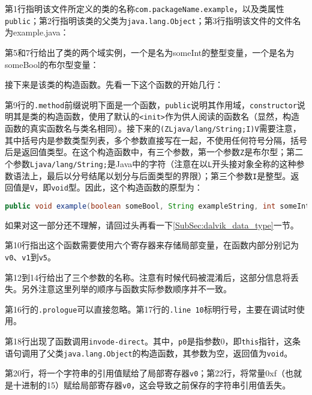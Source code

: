 第1行指明该文件所定义的类的名称\lstinline!com.packageName.example!，以及类属性\lstinline!public!；第2行指明该类的父类为\lstinline!java.lang.Object!；第3行指明该文件的文件名为example.java：


第5和7行给出了类的两个域实例，一个是名为someInt的整型变量，一个是名为someBool的布尔型变量：


接下来是该类的构造函数。先看一下这个函数的开始几行：

第9行的\lstinline!.method!前缀说明下面是一个函数，\lstinline!public!说明其作用域，\lstinline!constructor!说明其是类的构造函数，使用了默认的\lstinline!<init>!作为供人阅读的函数名（显然，构造函数的真实函数名与类名相同）。接下来的\lstinline!(ZLjava/lang/String;I)V!需要注意，其中括号内是参数类型列表，多个参数直接写在一起，不使用任何符号分隔，括号后是返回值类型。在这个构造函数中，有三个参数，第一个参数\lstinline!Z!是布尔型；第二个参数\lstinline!Ljava/lang/String;!是Java中的字符（注意在以\lstinline!L!开头接对象全称的这种参数语法上，最后以分号结尾以划分与后面类型的界限）；第三个参数\lstinline!I!是整型。返回值是\lstinline!V!，即\lstinline!void!型。因此，这个构造函数的原型为：
\begin{lstlisting}[language=java, numbers=none]
public void example(boolean someBool, String exampleString, int someInt);
\end{lstlisting}
如果对这一部分还不理解，请回过头再看一下\ref{SubSec:dalvik_data_type}一节。

第10行指出这个函数需要使用六个寄存器来存储局部变量，在函数内部分别记为\lstinline!v0!、\lstinline!v1!到\lstinline!v5!。

第12到14行给出了三个参数的名称。注意有时候代码被混淆后，这部分信息将丢失。另外注意这里列举的顺序与函数实际参数顺序并不一致。


第16行的\lstinline!.prologue!可以直接忽略。第17行的\lstinline!.line 10!标明行号，主要在调试时使用。

第18行出现了函数调用\lstinline!invode-direct!。其中，\lstinline!p0!是指参数0，即\lstinline!this!指针，这条语句调用了父类\lstinline!java.lang.Object!的构造函数，其参数为空，返回值为\lstinline!void!。


第20行，将一个字符串的引用值赋给了局部寄存器\lstinline!v0!；第22行，将常量0xf（也就是十进制的15）赋给局部寄存器\lstinline!v0!，这会导致之前保存的字符串引用值丢失。

